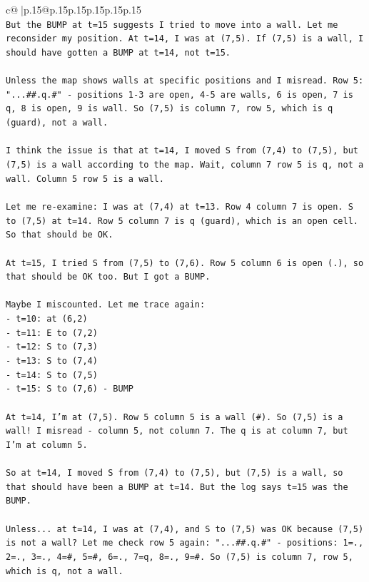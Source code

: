\documentclass{article}
\begin{document}
{\begin{supertabular}{c@{$\;$}|p{.15\linewidth}@{}p{.15\linewidth}p{.15\linewidth}p{.15\linewidth}p{.15\linewidth}p{.15\linewidth}}
{{{\\ 
\texttt{But the BUMP at t=15 suggests I tried to move into a wall. Let me reconsider my position. At t=14, I was at (7,5). If (7,5) is a wall, I should have gotten a BUMP at t=14, not t=15.} \\
\\ 
\texttt{Unless the map shows walls at specific positions and I misread. Row 5: "...\#\#.q.\#" {-} positions 1{-}3 are open, 4{-}5 are walls, 6 is open, 7 is q, 8 is open, 9 is wall. So (7,5) is column 7, row 5, which is q (guard), not a wall.} \\
\\ 
\texttt{I think the issue is that at t=14, I moved S from (7,4) to (7,5), but (7,5) is a wall according to the map. Wait, column 7 row 5 is q, not a wall. Column 5 row 5 is a wall.} \\
\\ 
\texttt{Let me re{-}examine: I was at (7,4) at t=13. Row 4 column 7 is open. S to (7,5) at t=14. Row 5 column 7 is q (guard), which is an open cell. So that should be OK.} \\
\\ 
\texttt{At t=15, I tried S from (7,5) to (7,6). Row 5 column 6 is open (.), so that should be OK too. But I got a BUMP.} \\
\\ 
\texttt{Maybe I miscounted. Let me trace again:} \\
\texttt{{-} t=10: at (6,2)} \\
\texttt{{-} t=11: E to (7,2)} \\
\texttt{{-} t=12: S to (7,3)} \\
\texttt{{-} t=13: S to (7,4)} \\
\texttt{{-} t=14: S to (7,5)} \\
\texttt{{-} t=15: S to (7,6) {-} BUMP} \\
\\ 
\texttt{At t=14, I'm at (7,5). Row 5 column 5 is a wall (\#). So (7,5) is a wall! I misread {-} column 5, not column 7. The q is at column 7, but I'm at column 5.} \\
\\ 
\texttt{So at t=14, I moved S from (7,4) to (7,5), but (7,5) is a wall, so that should have been a BUMP at t=14. But the log says t=15 was the BUMP.} \\
\\ 
\texttt{Unless... at t=14, I was at (7,4), and S to (7,5) was OK because (7,5) is not a wall? Let me check row 5 again: "...\#\#.q.\#" {-} positions: 1=., 2=., 3=., 4=\#, 5=\#, 6=., 7=q, 8=., 9=\#. So (7,5) is column 7, row 5, which is q, not a wall.} \\
}}}
\end{supertabular}}
\end{document}
